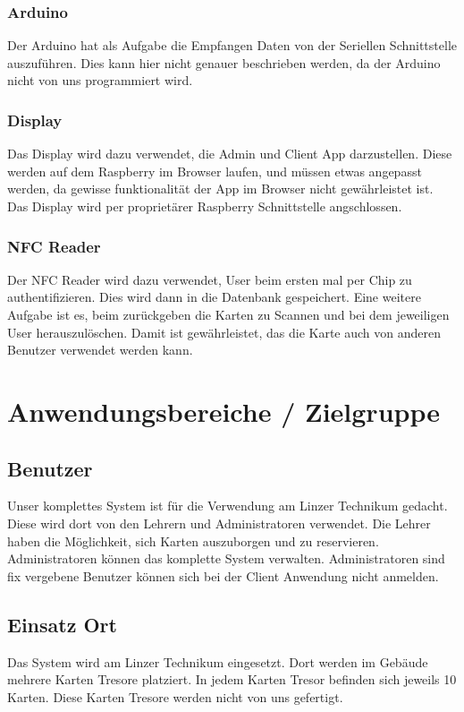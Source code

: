 \documentclass[a4paper]{article}
\begin{document}
\subsubsection{Arduino}
Der Arduino hat als Aufgabe die Empfangen Daten von der Seriellen Schnittstelle auszuführen. Dies kann hier nicht genauer beschrieben werden, da der Arduino nicht von uns programmiert wird.

\subsubsection{Display}
Das Display wird dazu verwendet, die Admin und Client App darzustellen. Diese werden auf dem Raspberry im Browser laufen, und müssen etwas angepasst werden, da gewisse funktionalität der App im Browser nicht gewährleistet ist. Das Display wird per proprietärer Raspberry Schnittstelle angschlossen.

\subsubsection{NFC Reader}
Der NFC Reader wird dazu verwendet, User beim ersten mal per Chip zu authentifizieren. Dies wird dann in die Datenbank gespeichert. Eine weitere Aufgabe ist es, beim zurückgeben die Karten zu Scannen und bei dem jeweiligen User herauszulöschen. Damit ist gewährleistet, das die Karte auch von anderen Benutzer verwendet werden kann.

\section{Anwendungsbereiche / Zielgruppe}
\subsection{Benutzer}
Unser komplettes System ist für die Verwendung am Linzer Technikum gedacht. Diese wird dort von den Lehrern und Administratoren verwendet. Die Lehrer haben die Möglichkeit, sich Karten auszuborgen und zu reservieren. Administratoren können das komplette System verwalten. Administratoren sind fix vergebene Benutzer können sich bei der Client Anwendung nicht anmelden.


\subsection{Einsatz Ort}
Das System wird am Linzer Technikum eingesetzt. Dort werden im Gebäude mehrere Karten Tresore platziert. In jedem Karten Tresor befinden sich jeweils 10 Karten. Diese Karten Tresore werden nicht von uns gefertigt.

\newpage

\listoffigures

\printbibliography

\end{document}
